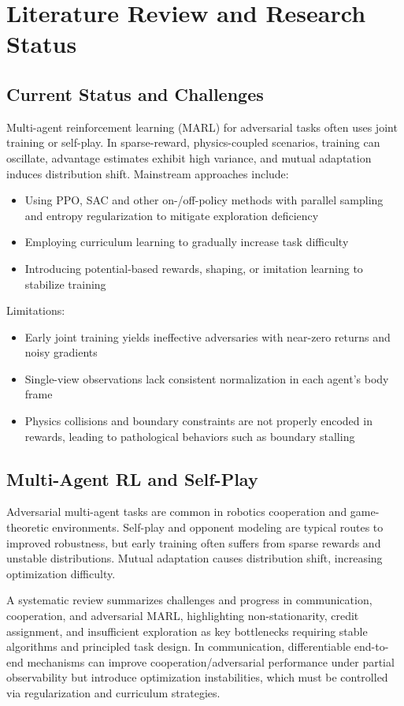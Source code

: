 \documentclass[12pt]{article}
\begin{document}
\section{Literature Review and Research Status}
\subsection{Current Status and Challenges}
Multi-agent reinforcement learning (MARL) for adversarial tasks often uses joint training or self-play. In sparse-reward, physics-coupled scenarios, training can oscillate, advantage estimates exhibit high variance, and mutual adaptation induces distribution shift. Mainstream approaches include:
\begin{itemize}
\item Using PPO, SAC and other on-/off-policy methods with parallel sampling and entropy regularization to mitigate exploration deficiency\cite{raffin2022stable,haarnoja2018sac}
\item Employing curriculum learning to gradually increase task difficulty\cite{bengio2009curriculum}
\item Introducing potential-based rewards, shaping, or imitation learning to stabilize training\cite{nguyen2020deep}
\end{itemize}
Limitations:
\begin{itemize}
\item Early joint training yields ineffective adversaries with near-zero returns and noisy gradients
\item Single-view observations lack consistent normalization in each agent’s body frame
\item Physics collisions and boundary constraints are not properly encoded in rewards, leading to pathological behaviors such as boundary stalling
\end{itemize}
\subsection{Multi-Agent RL and Self-Play}
Adversarial multi-agent tasks are common in robotics cooperation and game-theoretic environments. Self-play and opponent modeling are typical routes to improved robustness, but early training often suffers from sparse rewards and unstable distributions. Mutual adaptation causes distribution shift, increasing optimization difficulty.

A systematic review summarizes challenges and progress in communication, cooperation, and adversarial MARL, highlighting non-stationarity, credit assignment, and insufficient exploration as key bottlenecks requiring stable algorithms and principled task design\cite{nguyen2020deep}. In communication, differentiable end-to-end mechanisms can improve cooperation/adversarial performance under partial observability but introduce optimization instabilities, which must be controlled via regularization and curriculum strategies\cite{foerster2016learning}.
\end{document}
